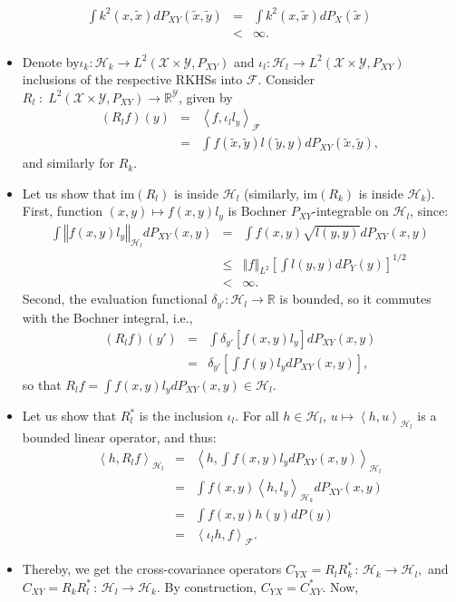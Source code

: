 \documentclass[english]{article}
\theoremstyle{definition}
\theoremstyle{plain}
\theoremstyle{definition}
\begin{document}
\begin{eqnarray*}
\int k^{2}(x,\tilde{x})dP_{XY}(\tilde{x},\tilde{y}) & = & \int k^{2}(x,\tilde{x})dP_{X}(\tilde{x})\\
 & < & \infty.
\end{eqnarray*}

\begin{itemize}
\item Denote by$\iota_{k}:\mathcal{H}_{k}\to L^{2}(\mathcal{X}\times\mathcal{Y},P_{XY})$
and $\iota_{l}:\mathcal{H}_{l}\to L^{2}(\mathcal{X}\times\mathcal{Y},P_{XY})$
inclusions of the respective RKHSs into $\mathcal{F}$. Consider $R_{l}\;:\;L^{2}(\mathcal{X}\times\mathcal{Y},P_{XY})\to\mathbb{R}^{\mathcal{Y}}$,
given by
\begin{eqnarray*}
(R_{l}f)(y) & = & \left\langle f,\iota_{l}l_{y}\right\rangle _{\mathcal{F}}\\
 & = & \int f(\tilde{x},\tilde{y})l(\tilde{y},y)dP_{XY}(\tilde{x},\tilde{y}),
\end{eqnarray*}
and similarly for $R_{k}$. 
\item Let us show that $\textrm{im}(R_{l})$ is inside $\mathcal{H}_{l}$
(similarly, $\textrm{im}(R_{k})$ is inside $\mathcal{H}_{k}$). First,
function $(x,y)\mapsto f(x,y)l_{y}$ is Bochner $P_{XY}$-integrable
on $\mathcal{H}_{l}$, since:
\begin{eqnarray*}
\int\left\Vert f(x,y)l_{y}\right\Vert _{\mathcal{H}_{l}}dP_{XY}(x,y) & = & \int f(x,y)\sqrt{l(y,y)}dP_{XY}(x,y)\\
 & \leq & \left\Vert f\right\Vert _{L^{2}}\left[\int l(y,y)dP_{Y}(y)\right]^{1/2}\\
 & < & \infty.
\end{eqnarray*}
Second, the evaluation functional $\delta_{y'}:\mathcal{H}_{l}\to\mathbb{R}$
is bounded, so it commutes with the Bochner integral, i.e., 
\begin{eqnarray*}
(R_{l}f)(y') & = & \int\delta_{y'}\left[f(x,y)l_{y}\right]dP_{XY}(x,y)\\
 & = & \delta_{y'}\left[\int f(y)l_{y}dP_{XY}(x,y)\right],
\end{eqnarray*}
so that $R_{l}f=\int f(x,y)l_{y}dP_{XY}(x,y)\in\mathcal{H}_{l}$.
\item Let us show that $R_{l}^{*}$ is the inclusion $\iota_{l}$. For all
$h\in\mathcal{H}_{l}$, $u\mapsto\left\langle h,u\right\rangle _{\mathcal{H}_{l}}$
is a bounded linear operator, and thus: 
\begin{eqnarray*}
\left\langle h,R_{l}f\right\rangle _{\mathcal{H}_{l}} & = & \left\langle h,\int f(x,y)l_{y}dP_{XY}(x,y)\right\rangle _{\mathcal{H}_{l}}\\
 & = & \int f(x,y)\left\langle h,l_{y}\right\rangle _{\mathcal{H}_{k}}dP_{XY}(x,y)\\
 & = & \int f(x,y)h(y)dP(y)\\
 & = & \left\langle \iota_{l}h,f\right\rangle _{\mathcal{F}}.
\end{eqnarray*}

\item Thereby, we get the cross-covariance operators $C_{YX}=R_{l}R_{k}^{*}\,:\,\mathcal{H}_{k}\to\mathcal{H}_{l},$
and $C_{XY}=R_{k}R_{l}^{*}\,:\,\mathcal{H}_{l}\to\mathcal{H}_{k}$.
By construction, $C_{YX}=C_{XY}^{*}$. Now,
\end{itemize}
\end{document}
